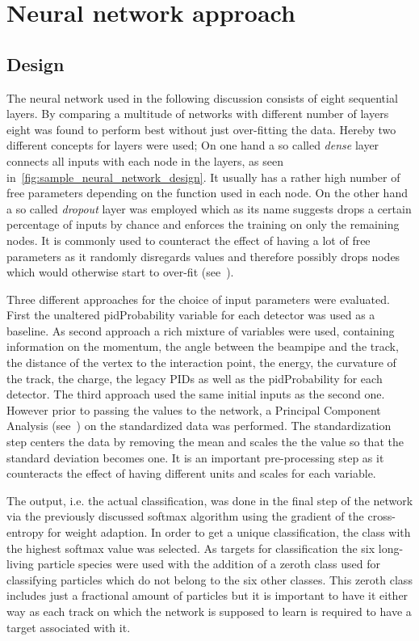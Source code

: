 \section{Neural network approach}
\label{sec:neural_network_approach}

\subsection{Design}
\label{subsec:neural_network_design}

The neural network used in the following discussion consists of eight sequential layers. By comparing a multitude of networks with different number of layers eight was found to perform best without just over-fitting the data. Hereby two different concepts for layers were used; On one hand a so called \textit{dense} layer connects all inputs with each node in the layers, as seen in~\autoref{fig:sample_neural_network_design}. It usually has a rather high number of free parameters depending on the function used in each node. On the other hand a so called \textit{dropout} layer was employed which as its name suggests drops a certain percentage of inputs by chance and enforces the training on only the remaining nodes. It is commonly used to counteract the effect of having a lot of free parameters as it randomly disregards values and therefore possibly drops nodes which would otherwise start to over-fit (see~\cite{MachineLearning:DeepLearning}).

Three different approaches for the choice of input parameters were evaluated. First the unaltered pidProbability variable for each detector was used as a baseline. As second approach a rich mixture of variables were used, containing information on the momentum, the angle between the beampipe and the track, the distance of the vertex to the interaction point, the energy, the curvature of the track, the charge, the legacy PIDs as well as the pidProbability for each detector. The third approach used the same initial inputs as the second one. However prior to passing the values to the network, a Principal Component Analysis (see~\cite{BigDataManagementAndAnalytics:TextProcessingAndHigh-DimensionalData}) on the standardized data was performed. The standardization step centers the data by removing the mean and scales the the value so that the standard deviation becomes one. It is an important pre-processing step as it counteracts the effect of having different units and scales for each variable.

The output, i.e. the actual classification, was done in the final step of the network via the previously discussed softmax algorithm using the gradient of the cross-entropy for weight adaption. In order to get a unique classification, the class with the highest softmax value was selected. As targets for classification the six long-living particle species were used with the addition of a zeroth class used for classifying particles which do not belong to the six other classes. This zeroth class includes just a fractional amount of particles but it is important to have it either way as each track on which the network is supposed to learn is required to have a target associated with it.

